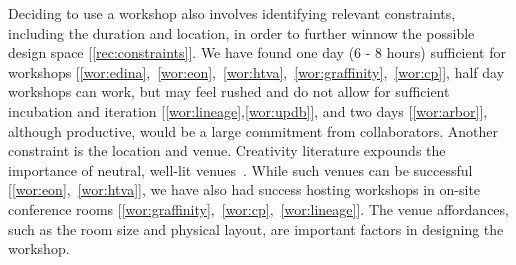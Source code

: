 Deciding to use a workshop also involves identifying relevant constraints, including the duration and location, in order to further winnow the possible design space [\ref{rec:constraints}]. We have found one day (6 - 8 hours) sufficient for workshops [\ref{wor:edina},~\ref{wor:eon},~\ref{wor:htva},~\ref{wor:graffinity},~\ref{wor:cp}], half day workshops can work, but may feel rushed and do not allow for sufficient incubation and iteration [\ref{wor:lineage},\ref{wor:updb}], and two days [\ref{wor:arbor}], although productive, would be a large commitment from collaborators. 
Another constraint is the location and venue. Creativity literature expounds the importance of neutral, well-lit venues~\cite{CreativeEducationFoundation2015,Isaksen2000}. While such venues can be successful [\ref{wor:eon},~\ref{wor:htva}], we have also had success hosting workshops in on-site conference rooms  [\ref{wor:graffinity},~\ref{wor:cp},~\ref{wor:lineage}]. The venue affordances, such as the room size and physical layout, are important factors in designing the workshop. 


